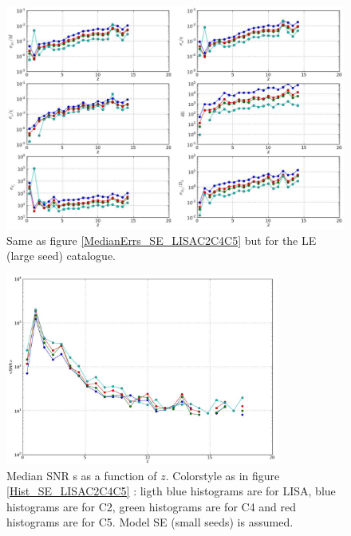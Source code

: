 \documentclass{iopart}
\begin{document}
\begin{figure}[H]
\center
   \includegraphics[width=1\textwidth]{FigSMBHPhenomAEI/MedianErrs_LE_LISAC2C4C5.eps}
\caption{Same as figure \ref{MedianErrs_SE_LISAC2C4C5} but for the LE (large seed) catalogue.
\label{MedianErrs_LE_LISAC2C4C5} } 
\end{figure}




\begin{figure}[H]
\center
   \includegraphics[width=0.8\textwidth]{FigSMBHPhenomAEI/MedianSNR_SE_LISAC2C4C5.eps}
\caption{Median SNR s as a function of  $z$. Colorstyle as in figure \ref{Hist_SE_LISAC2C4C5} : ligth blue histograms are for LISA, blue histograms are for C2, green histograms are for C4 and red histograms are for C5. Model SE (small seeds) is assumed.
\label{MedianSNR_SE_LISAC2C4C5} } 
\end{figure}
\end{document}
